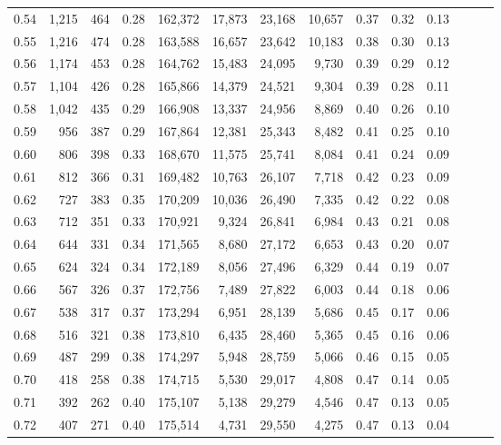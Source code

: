 \begin{tabular}{rrrrrrrrrrrrrr}
0.54 &  1,215 &  464 &  0.28 &  162,372 &   17,873 &  23,168 &  10,657 &  0.37 &  0.32 &      0.13 \\
0.55 &  1,216 &  474 &  0.28 &  163,588 &   16,657 &  23,642 &  10,183 &  0.38 &  0.30 &      0.13 \\
0.56 &  1,174 &  453 &  0.28 &  164,762 &   15,483 &  24,095 &   9,730 &  0.39 &  0.29 &      0.12 \\
0.57 &  1,104 &  426 &  0.28 &  165,866 &   14,379 &  24,521 &   9,304 &  0.39 &  0.28 &      0.11 \\
0.58 &  1,042 &  435 &  0.29 &  166,908 &   13,337 &  24,956 &   8,869 &  0.40 &  0.26 &      0.10 \\
0.59 &    956 &  387 &  0.29 &  167,864 &   12,381 &  25,343 &   8,482 &  0.41 &  0.25 &      0.10 \\
0.60 &    806 &  398 &  0.33 &  168,670 &   11,575 &  25,741 &   8,084 &  0.41 &  0.24 &      0.09 \\
0.61 &    812 &  366 &  0.31 &  169,482 &   10,763 &  26,107 &   7,718 &  0.42 &  0.23 &      0.09 \\
0.62 &    727 &  383 &  0.35 &  170,209 &   10,036 &  26,490 &   7,335 &  0.42 &  0.22 &      0.08 \\
0.63 &    712 &  351 &  0.33 &  170,921 &    9,324 &  26,841 &   6,984 &  0.43 &  0.21 &      0.08 \\
0.64 &    644 &  331 &  0.34 &  171,565 &    8,680 &  27,172 &   6,653 &  0.43 &  0.20 &      0.07 \\
0.65 &    624 &  324 &  0.34 &  172,189 &    8,056 &  27,496 &   6,329 &  0.44 &  0.19 &      0.07 \\
0.66 &    567 &  326 &  0.37 &  172,756 &    7,489 &  27,822 &   6,003 &  0.44 &  0.18 &      0.06 \\
0.67 &    538 &  317 &  0.37 &  173,294 &    6,951 &  28,139 &   5,686 &  0.45 &  0.17 &      0.06 \\
0.68 &    516 &  321 &  0.38 &  173,810 &    6,435 &  28,460 &   5,365 &  0.45 &  0.16 &      0.06 \\
0.69 &    487 &  299 &  0.38 &  174,297 &    5,948 &  28,759 &   5,066 &  0.46 &  0.15 &      0.05 \\
0.70 &    418 &  258 &  0.38 &  174,715 &    5,530 &  29,017 &   4,808 &  0.47 &  0.14 &      0.05 \\
0.71 &    392 &  262 &  0.40 &  175,107 &    5,138 &  29,279 &   4,546 &  0.47 &  0.13 &      0.05 \\
0.72 &    407 &  271 &  0.40 &  175,514 &    4,731 &  29,550 &   4,275 &  0.47 &  0.13 &      0.04 \\

\end{tabular}
